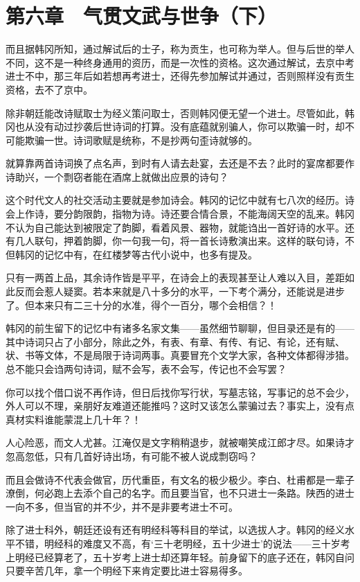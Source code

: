 \section{第六章　气贯文武与世争（下）}

而且据韩冈所知，通过解试后的士子，称为贡生，也可称为举人。但与后世的举人不同，这不是一种终身通用的资历，而是一次性的资格。这次通过解试，去京中考进士不中，那三年后如若想再考进士，还得先参加解试并通过，否则照样没有贡生资格，去不了京中。

除非朝廷能改诗赋取士为经义策问取士，否则韩冈便无望一个进士。尽管如此，韩冈也从没有动过抄袭后世诗词的打算。没有底蕴就别骗人，你可以欺骗一时，却不可能欺骗一世。诗词歌赋是统称，不是抄两句歪诗就够的。

就算靠两首诗词换了点名声，到时有人请去赴宴，去还是不去？此时的宴席都要作诗助兴，一个剽窃者能在酒席上就做出应景的诗句？

这个时代文人的社交活动主要就是参加诗会。韩冈的记忆中就有七八次的经历。诗会上作诗，要分韵限韵，指物为诗。诗还要合情合景，不能海阔天空的乱来。韩冈不认为自己能达到被限定了韵脚，看着风景、器物，就能诌出一首好诗的水平。还有几人联句，押着韵脚，你一句我一句，将一首长诗敷演出来。这样的联句诗，不但韩冈的记忆中有，在红楼梦等古代小说中，也多有提及。

只有一两首上品，其余诗作皆是平平，在诗会上的表现甚至让人难以入目，差距如此反而会惹人疑窦。若本来就是八十多分的水平，一下考个满分，还能说是进步了。但本来只有二三十分的水准，得个一百分，哪个会相信？！

韩冈的前生留下的记忆中有诸多名家文集——虽然细节聊聊，但目录还是有的——其中诗词只占了小部分，除此之外，有表、有章、有传、有记、有论，还有赋、状、书等文体，不是局限于诗词两事。真要冒充个文学大家，各种文体都得涉猎。总不能只会诌两句诗词，赋不会写，表不会写，传记也不会写罢？

你可以找个借口说不再作诗，但日后找你写行状，写墓志铭，写事记的总不会少，外人可以不理，亲朋好友难道还能推吗？这时又该怎么蒙骗过去？事实上，没有点真材实料谁能蒙混上几十年？！

人心险恶，而文人尤甚。江淹仅是文字稍稍退步，就被嘲笑成江郎才尽。如果诗才忽高忽低，只有几首好诗出场，有可能不被人说成剽窃吗？

而且会做诗不代表会做官，历代重臣，有文名的极少极少。李白、杜甫都是一辈子潦倒，何必跑上去添个自己的名字。而且要当官，也不只进士一条路。陕西的进士一向不多，但当官的并不少，并不是非要考进士不可。

除了进士科外，朝廷还设有还有明经科等科目的举试，以选拔人才。韩冈的经义水平不错，明经科的难度又不高，有‘三十老明经，五十少进士’的说法——三十岁考上明经已经算老了，五十岁考上进士却还算年轻。前身留下的底子还在，韩冈自问只要辛苦几年，拿一个明经下来肯定要比进士容易得多。

